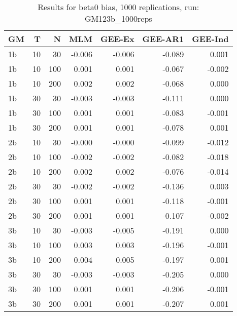 \begin{table}[ht]
\centering
\begin{tabular}{lrrrrrr}
  \hline
GM & T & N & MLM & GEE-Ex & GEE-AR1 & GEE-Ind \\ 
  \hline
1b & 10 & 30 & -0.006 & -0.006 & -0.089 & 0.001 \\ 
  1b & 10 & 100 & 0.001 & 0.001 & -0.067 & -0.002 \\ 
  1b & 10 & 200 & 0.002 & 0.002 & -0.068 & 0.000 \\ 
  1b & 30 & 30 & -0.003 & -0.003 & -0.111 & 0.000 \\ 
  1b & 30 & 100 & 0.001 & 0.001 & -0.083 & -0.001 \\ 
  1b & 30 & 200 & 0.001 & 0.001 & -0.078 & 0.001 \\ 
   \hline
2b & 10 & 30 & -0.000 & -0.000 & -0.099 & -0.012 \\ 
  2b & 10 & 100 & -0.002 & -0.002 & -0.082 & -0.018 \\ 
  2b & 10 & 200 & 0.002 & 0.002 & -0.076 & -0.014 \\ 
  2b & 30 & 30 & -0.002 & -0.002 & -0.136 & 0.003 \\ 
  2b & 30 & 100 & 0.001 & 0.001 & -0.118 & -0.001 \\ 
  2b & 30 & 200 & 0.001 & 0.001 & -0.107 & -0.002 \\ 
   \hline
3b & 10 & 30 & -0.003 & -0.005 & -0.191 & 0.000 \\ 
  3b & 10 & 100 & 0.003 & 0.003 & -0.196 & -0.001 \\ 
  3b & 10 & 200 & 0.004 & 0.005 & -0.197 & 0.001 \\ 
  3b & 30 & 30 & -0.003 & -0.003 & -0.205 & 0.000 \\ 
  3b & 30 & 100 & 0.001 & 0.001 & -0.206 & -0.001 \\ 
  3b & 30 & 200 & 0.001 & 0.001 & -0.207 & 0.001 \\ 
   \hline
\end{tabular}
\caption{Results for beta0 bias, 1000 replications, run: GM123b_1000reps} 
\label{tab:beta0_bias}
\end{table}

